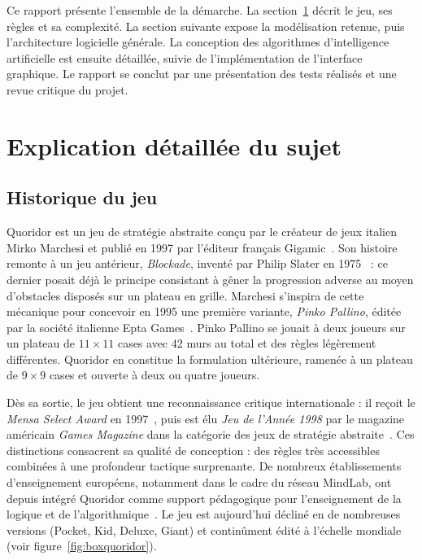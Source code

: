 \documentclass[a4paper]{article}
\begin{document}
Ce rapport présente l'ensemble de la démarche. La section~\ref{sec:sujet} décrit
le jeu, ses règles et sa complexité. La section suivante expose la modélisation
retenue, puis l'architecture logicielle générale. La conception des algorithmes
d'intelligence artificielle est ensuite détaillée, suivie de l'implémentation de
l'interface graphique. Le rapport se conclut par une présentation des tests
réalisés et une revue critique du projet.

\section{Explication détaillée du sujet}
\label{sec:sujet}

\subsection{Historique du jeu}
\label{subsec:historique}

Quoridor est un jeu de stratégie abstraite conçu par le créateur de
jeux italien Mirko Marchesi et publié en 1997 par l'éditeur français
Gigamic~\cite{marchesi1997,gigamic}. Son histoire remonte à un jeu
antérieur, \emph{Blockade}, inventé par Philip Slater en
1975~\cite{slater1975} : ce dernier posait déjà le principe consistant à
gêner la progression adverse au moyen d'obstacles disposés sur un
plateau en grille. Marchesi s'inspira de cette mécanique pour
concevoir en 1995 une première variante, \emph{Pinko Pallino}, éditée
par la société italienne Epta Games~\cite{marchesi1997}. Pinko Pallino
se jouait à deux joueurs sur un plateau de $11 \times 11$ cases avec
42 murs au total et des règles légèrement différentes. Quoridor en
constitue la formulation ultérieure, ramenée à un plateau de
$9 \times 9$ cases et ouverte à deux ou quatre joueurs.

Dès sa sortie, le jeu obtient une reconnaissance critique
internationale : il reçoit le \emph{Mensa Select Award} en
1997~\cite{mensa1997}, puis est élu \emph{Jeu de l'Année 1998} par le
magazine américain \emph{Games Magazine} dans la catégorie des jeux de
stratégie abstraite~\cite{games1998}. Ces distinctions consacrent sa
qualité de conception : des règles très accessibles combinées à une
profondeur tactique surprenante. De nombreux établissements
d'enseignement européens, notamment dans le cadre du réseau
MindLab, ont depuis intégré Quoridor comme support pédagogique pour
l'enseignement de la logique et de l'algorithmique~\cite{gigamic}.
Le jeu est aujourd'hui décliné en de nombreuses versions (Pocket,
Kid, Deluxe, Giant) et continûment édité à l'échelle mondiale
(voir figure~\ref{fig:boxquoridor}).
\end{document}
